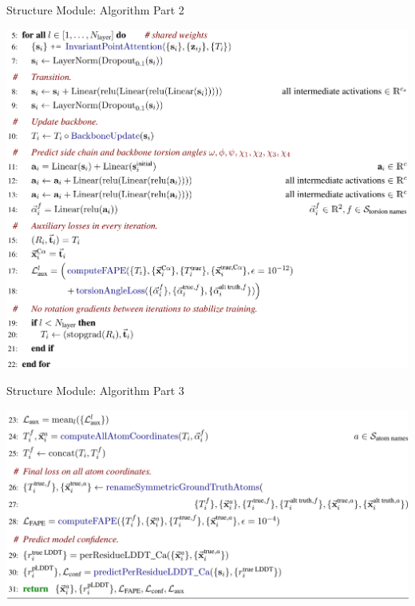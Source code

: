 \documentclass[presentation, smaller]{beamer}
\begin{document}
\begin{frame}[label={sec:orga3e3515}]{Structure Module: Algorithm Part 2 \cite{jumperHighlyAccurateProtein2021}}
\begin{center}
\includegraphics[height=0.9\textheight]{./imgs/algo20-part2.png}
\end{center}
\end{frame}

\begin{frame}[label={sec:org244dd17}]{Structure Module: Algorithm Part 3 \cite{jumperHighlyAccurateProtein2021}}
\begin{center}
\includegraphics[width=.9\linewidth]{./imgs/algo20-part3.png}
\end{center}
\end{frame}
\end{document}
